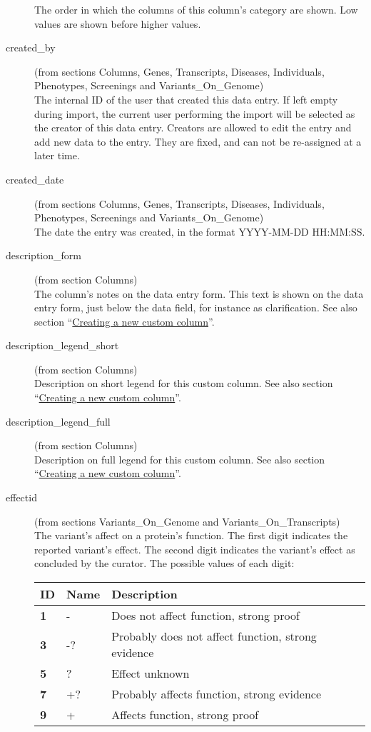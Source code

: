 \documentclass[a4paper,oneside,openany,12pt]{memoir}
\begin{document}
\begin{description}
  The order in which the columns of this column's category are shown.
  Low values are shown before higher values.
  \item[created\_by] (from sections Columns, Genes, Transcripts, Diseases, Individuals, Phenotypes, Screenings and Variants\_On\_Genome)\hfill \\
  The internal ID of the user that created this data entry.
  If left empty during import, the current user performing the import will be selected as the creator of this data entry.
  Creators are allowed to edit the entry and add new data to the entry.
  They are fixed, and can not be re-assigned at a later time.
  \item[created\_date] (from sections Columns, Genes, Transcripts, Diseases, Individuals, Phenotypes, Screenings and Variants\_On\_Genome)\hfill \\
  The date the entry was created, in the format YYYY-MM-DD HH:MM:SS.
  \item[description\_form] (from section Columns)\hfill \\
  The column's notes on the data entry form.
  This text is shown on the data entry form, just below the data field, for instance as clarification.
  See also section ``\hyperlink{sec:custom_column_create}{Creating a new custom column}''.
  \item[description\_legend\_short] (from section Columns)\hfill \\
  Description on short legend for this custom column.
  See also section ``\hyperlink{sec:custom_column_create}{Creating a new custom column}''.
  \item[description\_legend\_full] (from section Columns)\hfill \\
  Description on full legend for this custom column.
  See also section ``\hyperlink{sec:custom_column_create}{Creating a new custom column}''.
  \item[effectid] (from sections Variants\_On\_Genome and Variants\_On\_Transcripts)\hfill \\
  The variant's affect on a protein's function.
  The first digit indicates the reported variant's effect.
  The second digit indicates the variant's effect as concluded by the curator.
  The possible values of each digit:\\
  \begin{tabular}{>{\bfseries}p{0.6cm} p{2.3cm} p{11.7cm}}
    ID & \textbf{Name} & \textbf{Description}\\ \hline \hline
    1 & - & Does not affect function, strong proof\\ \hline
    3 & -? & Probably does not affect function, strong evidence\\ \hline
    5 & ? & Effect unknown\\ \hline
    7 & +? & Probably affects function, strong evidence\\ \hline
    9 & + & Affects function, strong proof\\ \hline
  \end{tabular}


\end{description}
\end{document}
